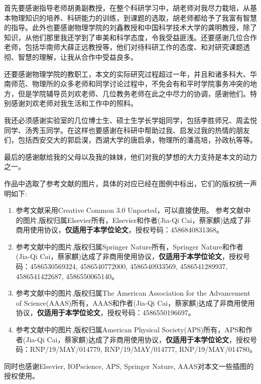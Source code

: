 \documentclass[supercite]{HustGraduPaper}
\begin{document}
	
	首先要感谢指导老师胡勇副教授，在整个科研学习中，胡老师对我尽力栽培，从基本物理知识的培养、科研能力的训练，到课题的选取，胡老师都给予了我富有智慧的指导。此外也要感谢物理学院的刘鑫教授和中国科学技术大学的龚明教授，除了知识，从他们那里我还学到了审美和科学态度，令我受益匪浅。还要感谢几位合作老师，包括华南师大薛正远教授等，他们对待科研工作的态度、和对研究课题透彻、智慧的理解，让我从合作中受益良多。
   
    还要感谢物理学院的教职工，本文的实际研究过程超过一年，并且和诸多科大、华南师范、物理所的众多老师和同学讨论过程中，不免会有和平时学院事务冲突的地方，但是学院辅导员刘欢老师、几位教务老师在此之中尽力的协调，感谢他们。特别感谢刘欢老师对我生活和工作中的照料。
	
	我还必须感谢实验室的几位博士生、硕士生学长学姐同学，包括李胜师兄、周孟悦同学、汤秀玉同学。在这样也要感谢在科研中帮助过我、启发过我的热情的朋友们，包括西安交大的郭启淏，西湖大学的唐启承，物理所的潘高培，孙政杭等等。
	
	最后的感谢献给我的父母以及我的妹妹，他们对我的梦想的大力支持是本文的动力之一。
	
	作品中选取了参考文献\cite{GU20171,di2017feynman,Roushan2017a,Roushan2017,owens2018quarter,rechtsman2013strain,rechtsman2013photonic,rechtsman2013topological,hafezi2011robust,hafezi2013imaging,mittal2016measurement,hong2018implementing}的图片，具体的对应已经在图例中标出，它们的版权统一声明如下:
	\begin{enumerate}
		\item 参考文献\cite{di2017feynman}采用Creative Common 3.0 Unported，可以直接使用。 参考文献\cite{GU20171}中的图片,版权归属Elsevier所有，Elsevier和作者(Jia-Qi Cai，蔡家麒)达成了非商用使用协议，\textbf{仅适用于本学位论文}，授权号码：4586840831368。
		\item 参考文献\cite{Roushan2017a,rechtsman2013strain,rechtsman2013photonic,hafezi2011robust,hafezi2013imaging,mittal2016measurement}中的图片,版权归属Springer Nature所有，Springer Nature和作者(Jia-Qi Cai，蔡家麒)达成了非商用使用协议，\textbf{仅适用于本学位论文}，授权号码：4586530569324, 4586540772000, 4586540933569, 4586541289937, 4586541422687, 4586550065140。
		\item 参考文献\cite{Roushan2017}中的图片,版权归属The American Association
		for the Advancement of Science(AAAS)所有，AAAS和作者(Jia-Qi Cai，蔡家麒)达成了非商用使用协议，\textbf{仅适用于本学位论文}，授权号码：4586550196697。
		\item 参考文献\cite{owens2018quarter,hong2018implementing,rechtsman2013topological}中的图片,版权归属American Physical Society(APS)所有，APS和作者(Jia-Qi Cai，蔡家麒)达成了非商用使用协议，\textbf{仅适用于本学位论文}，授权号码：RNP/19/MAY/014779, RNP/19/MAY/014777, RNP/19/MAY/014780。
	\end{enumerate}
	同时也感谢Elsevier, IOPscience, APS, Springer Nature, AAAS对本文一些插图的授权使用。
	
\end{document}
